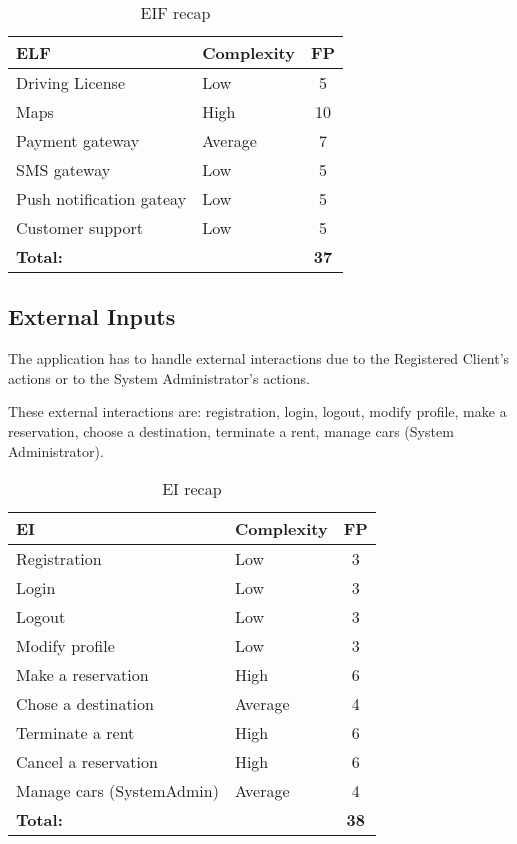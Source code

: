 \begin{table}[!h]
\centering
\caption{EIF recap}
\label{etl-recap}
\begin{tabularx}{\linewidth}{XXc}
\hline
\textbf{ELF}                       & \textbf{Complexity} & \textbf{FP} \\ \hline
Driving License           & Low        & 5 \\
Maps                      & High       & 10   \\
Payment gateway           & Average    & 7  \\
SMS gateway               & Low        & 5 \\
Push notification gateay  & Low        & 5 \\
Customer support          & Low        & 5 \\ \hline
\textbf{Total:}           &            & \textbf{37}
\end{tabularx}
\end{table}


\subsection{External Inputs }
The application has to handle external interactions due to the Registered Client’s actions or to the System Administrator’s actions.

These external interactions are: registration, login, logout, modify profile, make a reservation, choose a destination, terminate a rent, manage cars (System Administrator).

\begin{table}[!h]
\centering
\caption{EI recap}
\label{ei-recap}
\begin{tabularx}{\linewidth}{XXc}
\hline
\textbf{EI}                        & \textbf{Complexity} & \textbf{FP} \\ \hline
Registration              & Low        & 3  \\
Login                     & Low        & 3  \\
Logout                    & Low        & 3 \\
Modify profile            & Low        & 3  \\
Make a reservation        & High       & 6 \\
Chose a destination       & Average    & 4 \\
Terminate a rent          & High       & 6 \\
Cancel a reservation      & High       & 6 \\
Manage cars (SystemAdmin) & Average    & 4 \\ \hline
\textbf{Total:}           &            & \textbf{38}
\end{tabularx}
\end{table}

